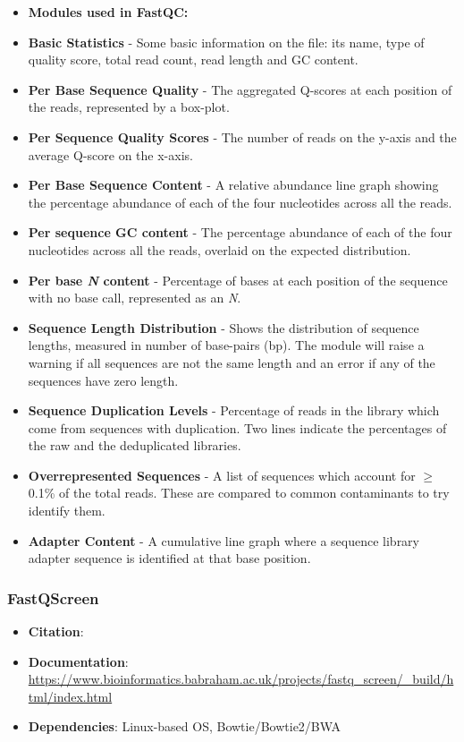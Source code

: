 \begin{itemize} \itemsep0em
\item[] \textbf{Modules used in FastQC:}
\item \textbf{Basic Statistics} - Some basic information on the file: its name, type of quality score, total read count, read length and GC content.
\item \textbf{Per Base Sequence Quality} - The aggregated Q-scores at each position of the reads, represented by a box-plot.
\item \textbf{Per Sequence Quality Scores} - The number of reads on the y-axis and the average Q-score on the x-axis.
\item \textbf{Per Base Sequence Content} - A relative abundance line graph showing the percentage abundance of each of the four nucleotides across all the reads. 
\item \textbf{Per sequence GC content} - The percentage abundance of each of the four nucleotides across all the reads, overlaid on the expected distribution. 
\item \textbf{Per base \textit{N} content} - Percentage of bases at each position of the sequence with no base call, represented as an \textit{N}.
\item \textbf{Sequence Length Distribution} - Shows the distribution of sequence lengths, measured in number of base-pairs (bp). The module will raise a warning if all sequences are not the same length and an error if any of the sequences have zero length.
\item \textbf{Sequence Duplication Levels} - Percentage of reads in the library which come from sequences with duplication. Two lines indicate the percentages of the raw and the deduplicated libraries.
\item \textbf{Overrepresented Sequences} - A list of sequences which account for $\geq$0.1\% of the total reads. These are compared to common contaminants to try identify them.
\item \textbf{Adapter Content} - A cumulative line graph where a sequence library adapter sequence is identified at that base position.
\end{itemize}

\subsubsection{FastQScreen}
\begin{itemize}\itemsep-0.5em
\item[] \textbf{Citation}: 				\cite{wingett2018fastq}
\item[] \textbf{Documentation}: 	\url{https://www.bioinformatics.babraham.ac.uk/projects/fastq_screen/_build/html/index.html}
\item[] \textbf{Dependencies}: Linux-based OS, Bowtie/Bowtie2/BWA
\end{itemize}

